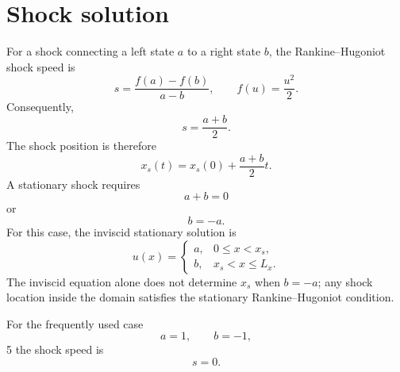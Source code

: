 \documentclass{mooiman_memo}
\begin{document}
\section{Shock solution}
%
For a shock connecting a left state $a$ to a right state $b$, the
Rankine--Hugoniot shock speed is
%
\begin{equation}
    s=
    \frac{f(a)-f(b)}{a-b},
    \qquad
    f(u)=\frac{u^2}{2}.
\end{equation}
%
Consequently,
%
\begin{equation}
    \boxed{
    s=\frac{a+b}{2}.
    }
\end{equation}
%
The shock position is therefore
%
\begin{equation}
    x_s(t)=x_s(0)+\frac{a+b}{2}t.
\end{equation}
%
A stationary shock requires
%
\begin{equation}
    \boxed{a+b=0}
\end{equation}
%
or
%
\begin{equation}
    \boxed{b=-a}.
\end{equation}
%
For this case, the inviscid stationary solution is
%
\begin{equation}
    u(x)=
    \begin{cases}
        a, & 0\leq x<x_s,\\
        b, & x_s<x\leq L_x.
    \end{cases}
\end{equation}
%
The inviscid equation alone does not determine $x_s$ when $b=-a$;
any shock location inside the domain satisfies the stationary
Rankine--Hugoniot condition.

For the frequently used case
%
\begin{equation}
    a=1,\qquad b=-1,
\end{equation}
5
the shock speed is
%
\begin{equation}
    s=0.
\end{equation}
%
\end{document}
